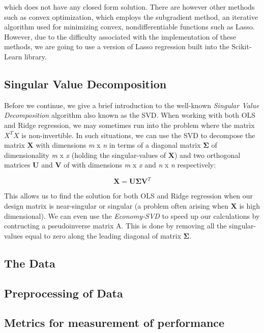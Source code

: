 \documentclass[a4paper, 10pt]{article}
\begin{document}
which does not have any closed form solution. There are however other methods such as convex optimization, which employs the subgradient method, an iterative algorithm used for minimizing convex, nondifferentiable functions such as Lasso. However, due to the difficulty associated with the implementation of these methods, we are going to use a version of Lasso regression built into the Scikit-Learn library.

\subsection{Singular Value Decomposition}
Before we continue, we give a brief introduction to the well-known \emph{Singular Value Decomposition} algorithm also known as the SVD. When working with both OLS and Ridge regression, we may sometimes run into the problem where the matrix $X^TX$ is non-invertible. In such situations, we can use the SVD to decompose the matrix $\boldsymbol{X}$ with dimensions \emph{m} x \emph{n} in terms of a diagonal matrix $\boldsymbol{\Sigma}$ of dimensionality \emph{m} x \emph{x} (holding the singular-values of $\boldsymbol{X}$) and two orthogonal matrices $\boldsymbol{U}$ and $\boldsymbol{V}$ of with dimensions \emph{m} x \emph{x} and \emph{n} x \emph{n} respectively: 

$$
\boldsymbol{X} = \boldsymbol{U}\boldsymbol{\Sigma}\boldsymbol{V}^T
$$

This allows us to find the solution for both OLS and Ridge regression when our design matrix is near-singular or singular (a problem often arising when $\boldsymbol{X}$ is high dimensional). We can even use the \emph{Economy-SVD} to speed up our calculations by contructing a pseudoinverse matrix A. This is done by removing all the singular-values equal to zero along the leading diagonal of matrix $\boldsymbol{\Sigma}$. 


\subsection{The Data}

\subsection{Preprocessing of Data}

\subsection{Metrics for measurement of performance}
\end{document}
